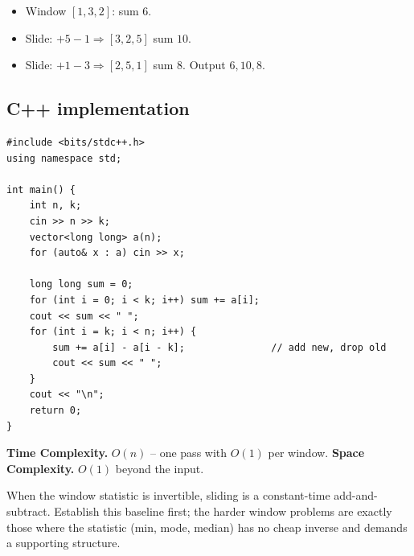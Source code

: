 
\begin{itemize}
  \item Window $[1,3,2]$: sum $6$.
  \item Slide: $+5-1\Rightarrow[3,2,5]$ sum $10$.
  \item Slide: $+1-3\Rightarrow[2,5,1]$ sum $8$. Output $6,10,8$.
\end{itemize}

\subsection*{C++ implementation}

\begin{lstlisting}
#include <bits/stdc++.h>
using namespace std;

int main() {
    int n, k;
    cin >> n >> k;
    vector<long long> a(n);
    for (auto& x : a) cin >> x;

    long long sum = 0;
    for (int i = 0; i < k; i++) sum += a[i];
    cout << sum << " ";
    for (int i = k; i < n; i++) {
        sum += a[i] - a[i - k];               // add new, drop old
        cout << sum << " ";
    }
    cout << "\n";
    return 0;
}
\end{lstlisting}

\begin{complexitybox}
\textbf{Time Complexity.} $O(n)$ -- one pass with $O(1)$ per window.
\textbf{Space Complexity.} $O(1)$ beyond the input.
\end{complexitybox}

\begin{takeawaybox}
When the window statistic is invertible, sliding is a constant-time
add-and-subtract. Establish this baseline first; the harder window problems
are exactly those where the statistic (min, mode, median) has no cheap
inverse and demands a supporting structure.
\end{takeawaybox}
